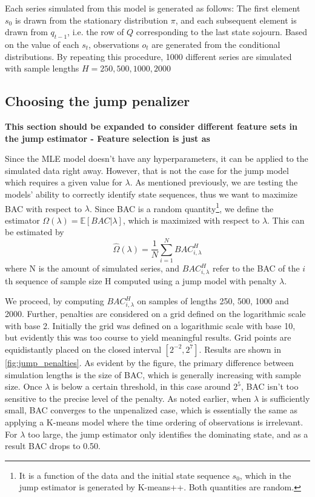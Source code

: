 Each series simulated from this model is generated as follows: The first element $s_0$ is drawn from the stationary distribution $\pi$, and each subsequent element is drawn from $q_{t-1}$, i.e. the row of $Q$ corresponding to the last state sojourn. Based on the value of each $s_t$, observations $o_t$ are generated from the conditional distributions. By repeating this procedure, 1000 different series are simulated with sample lengths $H = 250, 500, 1000, 2000$

\subsection{Choosing the jump penalizer}
\label{subsection: jump_penalizer}

\textbf{This section should be expanded to consider different feature sets in the jump estimator - Feature selection is just as }

Since the MLE model doesn't have any hyperparameters, it can be applied to the simulated data right away. However, that is not the case for the jump model which requires a given value for $\lambda$. As mentioned previously, we are testing the models' ability to correctly identify state sequences, thus we want to maximize BAC with respect to $\lambda$. Since BAC is a random quantity\footnote
{It is a function of the data and the initial state sequence $s_0$, which in the jump estimator is generated by K-means++. Both quantities are random.
},
we define the estimator $\Omega(\lambda)= \mathbb{E}[BAC|\lambda]$, which is maximized with respect to $\lambda$. This can be estimated by 
\begin{equation}
    \hat\Omega(\lambda) = \frac{1}{N} \sum_{i=1}^N BAC_{i, \lambda}^H
\end{equation}
where N is the amount of simulated series, and $BAC_{i, \lambda}^H$ refer to the BAC of the $i$th sequence of sample size H computed using a jump model with penalty $\lambda$.

We proceed, by computing $BAC_{i, \lambda}^H$ on samples of lengths 250, 500, 1000 and 2000. Further, penalties are considered on a grid defined on the logarithmic scale with base 2. Initially the grid was defined on a logarithmic scale with base 10, but evidently this was too course to yield meaningful results. Grid points are equidistantly placed on the closed interval $[2^{-2}, 2^{7}]$. Results are shown in \cref{fig:jump_penalties}. As evident by the figure, the primary difference between simulation lengths is the size of BAC, which is generally increasing with sample size. Once $\lambda$ is below a certain threshold, in this case around $2^5$, BAC isn't too sensitive to the precise level of the penalty. As noted earlier, when $\lambda$ is sufficiently small, BAC converges to the unpenalized case, which is essentially the same as applying a K-means model where the time ordering of observations is irrelevant. For $\lambda$ too large, the jump estimator only identifies the dominating state, and as a result BAC drops to 0.50. 

